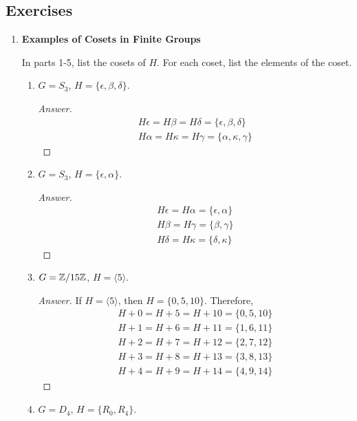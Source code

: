 \documentclass[../notes.tex]{subfiles}
\begin{document}
\subsection*{Exercises}
\begin{enumerate}[label={\textbf{\Alph*.}}]
    \item \textbf{Examples of Cosets in Finite Groups}\par
    In parts 1-5, list the cosets of $H$. For each coset, list the elements of the coset.
    \begin{enumerate}
        \item $G=S_3$, $H=\{\epsilon,\beta,\delta\}$.
        \begin{proof}[Answer]
            \begin{gather*}
                H\epsilon = H\beta = H\delta = \{\epsilon,\beta,\delta\}\\
                H\alpha = H\kappa = H\gamma = \{\alpha,\kappa,\gamma\}
            \end{gather*}
        \end{proof}
        \item $G=S_3$, $H=\{\epsilon,\alpha\}$.
        \begin{proof}[Answer]
            \begin{gather*}
                H\epsilon = H\alpha = \{\epsilon,\alpha\}\\
                H\beta = H\gamma = \{\beta,\gamma\}\\
                H\delta = H\kappa = \{\delta,\kappa\}
            \end{gather*}
        \end{proof}
        \item $G=\mathbb{Z}/15\mathbb{Z}$, $H=\langle 5\rangle$.
        \begin{proof}[Answer]
            If $H=\langle 5\rangle$, then $H=\{0,5,10\}$. Therefore,
            \begin{gather*}
                H+0 = H+5 = H+10 = \{0,5,10\}\\
                H+1 = H+6 = H+11 = \{1,6,11\}\\
                H+2 = H+7 = H+12 = \{2,7,12\}\\
                H+3 = H+8 = H+13 = \{3,8,13\}\\
                H+4 = H+9 = H+14 = \{4,9,14\}
            \end{gather*}
        \end{proof}
        \item $G=D_4$, $H=\{R_0,R_4\}$.

\end{enumerate}
\end{enumerate}
\end{document}
